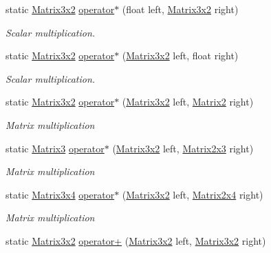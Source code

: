 \begin{DoxyCompactItemize}
static \hyperlink{struct_open_t_k_1_1_matrix3x2}{Matrix3x2} \hyperlink{struct_open_t_k_1_1_matrix3x2_acac59fc295a125556699f408c0c929e9}{operator$\ast$} (float left, \hyperlink{struct_open_t_k_1_1_matrix3x2}{Matrix3x2} right)
\begin{DoxyCompactList}\small\item\em Scalar multiplication. \end{DoxyCompactList}\item 
static \hyperlink{struct_open_t_k_1_1_matrix3x2}{Matrix3x2} \hyperlink{struct_open_t_k_1_1_matrix3x2_a108a88dfe743c44ab3356ffe1de5197e}{operator$\ast$} (\hyperlink{struct_open_t_k_1_1_matrix3x2}{Matrix3x2} left, float right)
\begin{DoxyCompactList}\small\item\em Scalar multiplication. \end{DoxyCompactList}\item 
static \hyperlink{struct_open_t_k_1_1_matrix3x2}{Matrix3x2} \hyperlink{struct_open_t_k_1_1_matrix3x2_ab4f261a899a26bf72cbf9b8a7f6a6acd}{operator$\ast$} (\hyperlink{struct_open_t_k_1_1_matrix3x2}{Matrix3x2} left, \hyperlink{struct_open_t_k_1_1_matrix2}{Matrix2} right)
\begin{DoxyCompactList}\small\item\em Matrix multiplication \end{DoxyCompactList}\item 
static \hyperlink{struct_open_t_k_1_1_matrix3}{Matrix3} \hyperlink{struct_open_t_k_1_1_matrix3x2_acb905b4ca38335a69db435469bd2ce03}{operator$\ast$} (\hyperlink{struct_open_t_k_1_1_matrix3x2}{Matrix3x2} left, \hyperlink{struct_open_t_k_1_1_matrix2x3}{Matrix2x3} right)
\begin{DoxyCompactList}\small\item\em Matrix multiplication \end{DoxyCompactList}\item 
static \hyperlink{struct_open_t_k_1_1_matrix3x4}{Matrix3x4} \hyperlink{struct_open_t_k_1_1_matrix3x2_a60b9463bd4e4615e3ad704306346418e}{operator$\ast$} (\hyperlink{struct_open_t_k_1_1_matrix3x2}{Matrix3x2} left, \hyperlink{struct_open_t_k_1_1_matrix2x4}{Matrix2x4} right)
\begin{DoxyCompactList}\small\item\em Matrix multiplication \end{DoxyCompactList}\item 
static \hyperlink{struct_open_t_k_1_1_matrix3x2}{Matrix3x2} \hyperlink{struct_open_t_k_1_1_matrix3x2_a4d613990a067ffe78909e096d163cd0e}{operator+} (\hyperlink{struct_open_t_k_1_1_matrix3x2}{Matrix3x2} left, \hyperlink{struct_open_t_k_1_1_matrix3x2}{Matrix3x2} right)

\end{DoxyCompactItemize}
